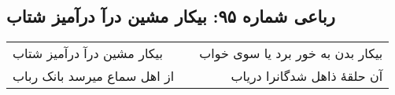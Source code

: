 \begin{center}
\section*{رباعی شماره ۹۵: بیکار مشین درآ درآمیز شتاب}
\label{sec:0095}
\begin{longtable}{l p{0.5cm} r}
بیکار مشین درآ درآمیز شتاب
&&
بیکار بدن به خور برد یا سوی خواب
\\
از اهل سماع میرسد بانک رباب
&&
آن حلقهٔ ذاهل شدگانرا دریاب
\\
\end{longtable}
\end{center}

